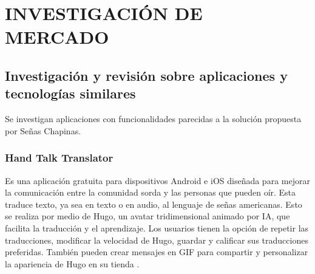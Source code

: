 \section{INVESTIGACIÓN DE MERCADO}

\subsection{Investigación y revisión sobre aplicaciones y tecnologías similares}

Se investigan aplicaciones con funcionalidades parecidas a la solución propuesta por Señas Chapinas. 

\subsubsection{Hand Talk Translator}

Es una aplicación gratuita para dispositivos Android e iOS diseñada para mejorar la comunicación entre la comunidad sorda y las personas que pueden oír. Esta traduce texto, ya sea en texto o en audio, al lenguaje de señas americanas. Esto se realiza por medio de Hugo, un avatar tridimensional animado por IA, que facilita la traducción y el aprendizaje. Los usuarios tienen la opción de repetir las traducciones, modificar la velocidad de Hugo, guardar y calificar sus traducciones preferidas. También pueden crear mensajes en GIF para compartir y personalizar la apariencia de Hugo en su tienda \cite{Foggetti2023}.

